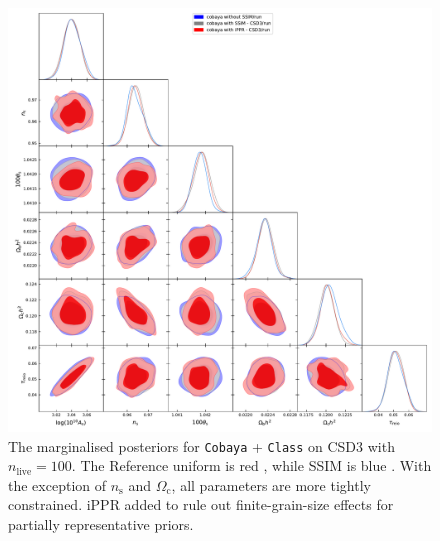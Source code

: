 \documentclass[draft,usenatbib]{mnras}
\begin{document}
\begin{landscape}
\begin{figure}
\centering %
\includegraphics[height=0.95\textheight]{./illustrations/cosmology.pdf}
\caption{The marginalised posteriors for \texttt{Cobaya} +
\texttt{Class} on CSD3 with \(n_\text{live}=100\). The Reference
uniform is \color{red} red \color{black}, while SSIM is
\color{blue} blue \color{black}. With the exception of
\(n_\mathrm{s}\) and \(\Omega_\mathrm{c}\), all parameters are
more tightly constrained. iPPR added to rule out finite-grain-size
effects for partially representative
priors. } \label{fig:cosmology}
\end{figure}
\end{landscape}
\end{document}
